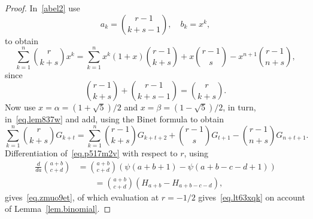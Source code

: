 \documentclass[12pt,reqno]{article}
\begin{document}
	\begin{proof}
		In~\eqref{abel2} use
		\begin{equation*}
			a_k  = \binom{{r - 1}}{{k + s - 1}},\quad b_k=x^k,
		\end{equation*}
		to obtain
		\begin{equation}\label{eq.lem837w}
			\sum_{k = 1}^n {\binom{{r}}{{k + s}}x^k}  = \sum_{k = 1}^n {x^k \left( {1 + x} \right)\binom{{r - 1}}{{k + s}}}  + x\binom{{r - 1}}{s} - x^{n + 1} \binom{{r - 1}}{{n + s}},
		\end{equation}
		since
		\begin{equation*}
			\binom{{r - 1}}{{k + s}} + \binom{{r - 1}}{{k + s - 1}} = \binom{{r}}{{k + s}}.
		\end{equation*}
		Now use $x=\alpha=(1+\sqrt 5)/2$ and $x=\beta=(1-\sqrt 5)/2$, in turn, in~\eqref{eq.lem837w} and add, using the Binet formula to obtain
		\begin{equation}\label{eq.p517m2v}
			\sum_{k = 1}^n {\binom{{r}}{{k + s}}G_{k + t} }  = \sum_{k = 1}^n {\binom{{r - 1}}{{k + s}}G_{k + t + 2} }  + \binom{{r - 1}}{s}G_{t + 1}  - \binom{{r - 1}}{{n + s}}G_{n + t + 1} .
		\end{equation}
		Differentiation of~\eqref{eq.p517m2v} with respect to $r$, using
		\begin{equation*}
			\begin{split}
				\frac{d}{{da}}\binom{{a + b}}{{c + d}} &= \binom{{a + b}}{{c + d}}\left( {\psi \left( {a + b + 1} \right) - \psi \left( {a + b - c - d + 1} \right)} \right)\\
				&\qquad = \binom{{a + b}}{{c + d}}\left( {H_{a + b}  - H _{a + b - c - d} } \right),
			\end{split}
		\end{equation*}
		gives~\eqref{eq.zmuo9et}, of which evaluation at $r=-1/2$ gives~\eqref{eq.lt63xqk} on account of Lemma~\ref{lem.binomial}.
	\end{proof}
	
\end{document}
